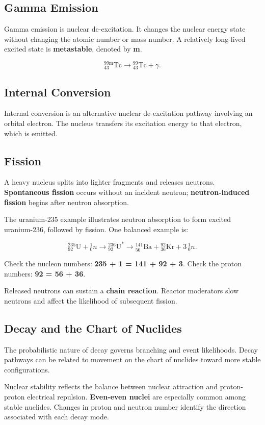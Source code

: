 \documentclass[11pt,a4paper]{article}
\let\originalsubsection\subsection
\renewcommand{\subsection}{\Needspace{8\baselineskip}\originalsubsection}
\begin{document}
\subsection{Gamma Emission}
Gamma emission is nuclear de-excitation. It changes the nuclear energy state without changing the atomic number or mass number. A relatively long-lived excited state is \textbf{metastable}, denoted by \textbf{m}.

\[{}^{99\mathrm{m}}_{43}\mathrm{Tc}\longrightarrow{}^{99}_{43}\mathrm{Tc}+\gamma.\]

\subsection{Internal Conversion}
Internal conversion is an alternative nuclear de-excitation pathway involving an orbital electron. The nucleus transfers its excitation energy to that electron, which is emitted.

\subsection{Fission}
A heavy nucleus splits into lighter fragments and releases neutrons. \textbf{Spontaneous fission} occurs without an incident neutron; \textbf{neutron-induced fission} begins after neutron absorption.

The uranium-235 example illustrates neutron absorption to form excited uranium-236, followed by fission. One balanced example is:

\[{}^{235}_{92}\mathrm{U}+{}^{1}_{0}n\longrightarrow{}^{236}_{92}\mathrm{U}^{*}\longrightarrow{}^{141}_{56}\mathrm{Ba}+{}^{92}_{36}\mathrm{Kr}+3\,{}^{1}_{0}n.\]

Check the nucleon numbers: \textbf{235 + 1 = 141 + 92 + 3}. Check the proton numbers: \textbf{92 = 56 + 36}.

Released neutrons can sustain a \textbf{chain reaction}. Reactor moderators slow neutrons and affect the likelihood of subsequent fission.

\subsection{Decay and the Chart of Nuclides}
The probabilistic nature of decay governs branching and event likelihoods. Decay pathways can be related to movement on the chart of nuclides toward more stable configurations.

Nuclear stability reflects the balance between nuclear attraction and proton-proton electrical repulsion. \textbf{Even-even nuclei} are especially common among stable nuclides. Changes in proton and neutron number identify the direction associated with each decay mode.
\end{document}
